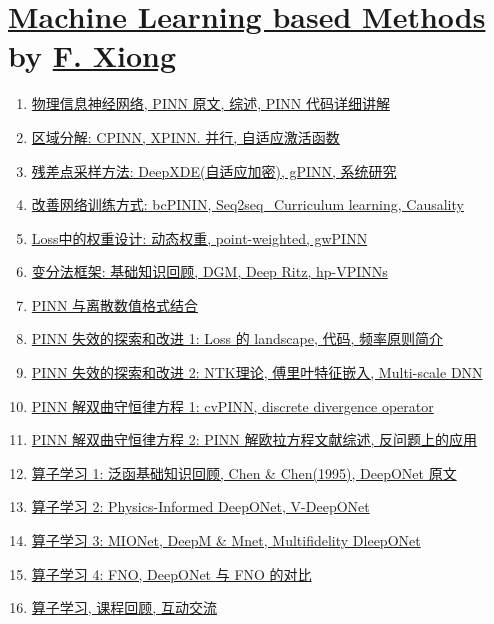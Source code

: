 \documentclass[11pt]{article}
\begin{document}
\newpage 

\section[Machine Learning based Methods]{{\large \href{https://www.bilibili.com/video/BV1nT411e7cC/?spm_id_from=333.1387.homepage.video_card.click&vd_source=d0661ef3fa56ddc850a3d1afc8c571e5}{Machine Learning based Methods}} by {\large \href{https://www.bimsa.cn/detail/fxiong.html}{F. Xiong}}}

\vspace{-0.5cm}

\begin{enumerate}
	\item \href{https://mp.weixin.qq.com/s/bUz1SwnVAWd7hXHuJkSehQ}{物理信息神经网络, PINN 原文, 综述, PINN 代码详细讲解}	%
	\item \href{https://mp.weixin.qq.com/s/HvSHWvno7AZ6iF0D5Dv02A}{区域分解: CPINN, XPINN. 并行, 自适应激活函数}	%
	\item \href{https://mp.weixin.qq.com/s/m6aEUkQ6zhx3DuUS5ciJNw}{残差点采样方法: DeepXDE(自适应加密), gPINN, 系统研究}	%
	\item \href{https://mp.weixin.qq.com/s/ByUhP-jyw4zgULcycfC6rQ}{改善网络训练方式: bcPININ, Seq2seq\_Curriculum learning, Causality}	%
	\item \href{https://mp.weixin.qq.com/s/mPpJz7k0ph6YEaZHj37UIA}{Loss中的权重设计: 动态权重, point-weighted, gwPINN}	%
	\item \href{https://mp.weixin.qq.com/s/k24dhUPOV9MBOCo2XYlRzg}{变分法框架: 基础知识回顾, DGM, Deep Ritz, hp-VPINNs}	%
	\item \href{https://mp.weixin.qq.com/s/dCGnzz_v7Y4lisPB0-_jHA}{PINN 与离散数值格式结合}	%
	\item \href{https://mp.weixin.qq.com/s/rrF0KjFAe53rHg2O65lyZQ}{PINN 失效的探索和改进 1: Loss 的 landscape, 代码, 频率原则简介}	%
	\item \href{https://mp.weixin.qq.com/s/D-DSUyBqHD0MfCduaqmF_A}{PINN 失效的探索和改进 2: NTK理论, 傅里叶特征嵌入, Multi-scale DNN}	%
	\item \href{https://mp.weixin.qq.com/s/5UHaDEPEwW5z1s7mHMDrFw}{PINN 解双曲守恒律方程 1: cvPINN, discrete divergence operator}	%
	\item \href{https://mp.weixin.qq.com/s/1fyPQ3FHYSX0VIMSEokGKw}{PINN 解双曲守恒律方程 2: PINN 解欧拉方程文献综述, 反问题上的应用}	%
	\item \href{https://mp.weixin.qq.com/s/rxP3E0sBmDyUVWgigzTzxw}{算子学习 1: 泛函基础知识回顾, Chen \& Chen(1995), DeepONet 原文}	%
	\item \href{https://mp.weixin.qq.com/s/CE5BaMBmoBoTFOB5XD22XA}{算子学习 2: Physics-Informed DeepONet, V-DeepONet}	%
	\item \href{https://mp.weixin.qq.com/s/8gvPWBGnO5q8Q0nJNNfiiQ}{算子学习 3: MIONet, DeepM \& Mnet, Multifidelity DleepONet}	%
	\item \href{https://mp.weixin.qq.com/s/O84YmVMnmKvhCp6qKnfn_g}{算子学习 4: FNO, DeepONet 与 FNO 的对比}	%
	\item \href{https://mp.weixin.qq.com/s/yVZgv8RmqPHUXLepu93NAA}{算子学习, 课程回顾, 互动交流}	%
\end{enumerate}
\end{document}
